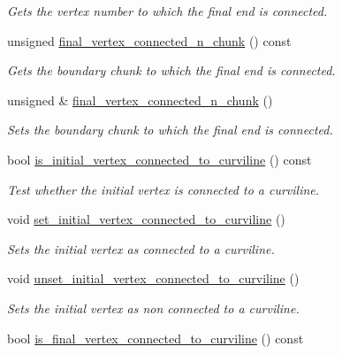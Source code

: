 \begin{DoxyCompactItemize}
\begin{DoxyCompactList}\small\item\em Gets the vertex number to which the final end is connected. \end{DoxyCompactList}\item 
unsigned \hyperlink{classoomph_1_1TriangleMeshCurveSection_a5a313270409b3ea9abde6ed7c6c65568}{final\+\_\+vertex\+\_\+connected\+\_\+n\+\_\+chunk} () const
\begin{DoxyCompactList}\small\item\em Gets the boundary chunk to which the final end is connected. \end{DoxyCompactList}\item 
unsigned \& \hyperlink{classoomph_1_1TriangleMeshCurveSection_a7762be2ff2f975f38365c6dc50719664}{final\+\_\+vertex\+\_\+connected\+\_\+n\+\_\+chunk} ()
\begin{DoxyCompactList}\small\item\em Sets the boundary chunk to which the final end is connected. \end{DoxyCompactList}\item 
bool \hyperlink{classoomph_1_1TriangleMeshCurveSection_a0ab0172007e3e875ff0875a30de76dac}{is\+\_\+initial\+\_\+vertex\+\_\+connected\+\_\+to\+\_\+curviline} () const
\begin{DoxyCompactList}\small\item\em Test whether the initial vertex is connected to a curviline. \end{DoxyCompactList}\item 
void \hyperlink{classoomph_1_1TriangleMeshCurveSection_ad594045d620e693b982612987e417092}{set\+\_\+initial\+\_\+vertex\+\_\+connected\+\_\+to\+\_\+curviline} ()
\begin{DoxyCompactList}\small\item\em Sets the initial vertex as connected to a curviline. \end{DoxyCompactList}\item 
void \hyperlink{classoomph_1_1TriangleMeshCurveSection_afe70e0361f462012910e958253fdcb91}{unset\+\_\+initial\+\_\+vertex\+\_\+connected\+\_\+to\+\_\+curviline} ()
\begin{DoxyCompactList}\small\item\em Sets the initial vertex as non connected to a curviline. \end{DoxyCompactList}\item 
bool \hyperlink{classoomph_1_1TriangleMeshCurveSection_a8c02d1fa4b159f23cb76b3ec98cb4c69}{is\+\_\+final\+\_\+vertex\+\_\+connected\+\_\+to\+\_\+curviline} () const

\end{DoxyCompactItemize}
